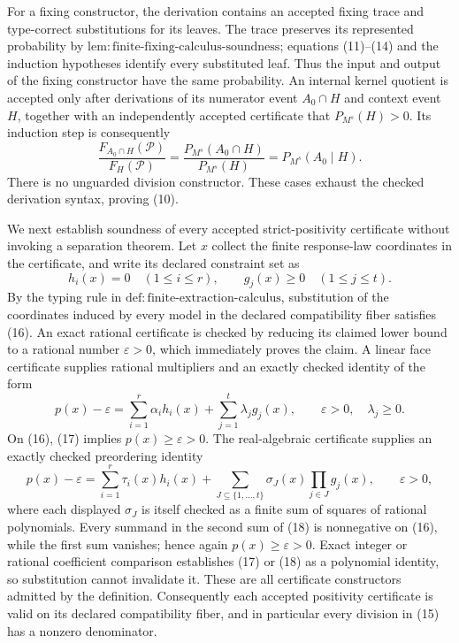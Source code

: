 For a fixing constructor, the derivation contains an accepted fixing trace and type-correct substitutions for its leaves.  The trace preserves its represented probability by \(\mathrm{lem:finite\text{-}fixing\text{-}calculus\text{-}soundness}\); equations (11)--(14) and the induction hypotheses identify every substituted leaf.  Thus the input and output of the fixing constructor have the same probability.  An internal kernel quotient is accepted only after derivations of its numerator event \(A_0\cap H\) and context event \(H\), together with an independently accepted certificate that \(P_{M^s}(H)>0\).  Its induction step is consequently
\[
 \frac{F_{A_0\cap H}(\mathcal P)}{F_H(\mathcal P)}
 =\frac{P_{M^s}(A_0\cap H)}{P_{M^s}(H)}
 =P_{M^s}(A_0\mid H).
\tag{15}
\]
There is no unguarded division constructor.  These cases exhaust the checked derivation syntax, proving (10).

We next establish soundness of every accepted strict-positivity certificate without invoking a separation theorem.  Let \(x\) collect the finite response-law coordinates in the certificate, and write its declared constraint set as
\[
 h_i(x)=0\quad(1\le i\le r),
 \qquad g_j(x)\ge0\quad(1\le j\le t).
\tag{16}
\]
By the typing rule in \(\mathrm{def:finite\text{-}extraction\text{-}calculus}\), substitution of the coordinates induced by every model in the declared compatibility fiber satisfies (16).  An exact rational certificate is checked by reducing its claimed lower bound to a rational number \(\varepsilon>0\), which immediately proves the claim.  A linear face certificate supplies rational multipliers and an exactly checked identity of the form
\[
 p(x)-\varepsilon
 =\sum_{i=1}^{r}\alpha_i h_i(x)
  +\sum_{j=1}^{t}\lambda_j g_j(x),
 \qquad \varepsilon>0,\quad \lambda_j\ge0.
\tag{17}
\]
On (16), (17) implies \(p(x)\ge\varepsilon>0\).  The real-algebraic certificate supplies an exactly checked preordering identity
\[
 p(x)-\varepsilon
 =\sum_{i=1}^{r}\tau_i(x)h_i(x)
  +\sum_{J\subseteq\{1,\ldots,t\}}
    \sigma_J(x)\prod_{j\in J}g_j(x),
 \qquad \varepsilon>0,
\tag{18}
\]
where each displayed \(\sigma_J\) is itself checked as a finite sum of squares of rational polynomials.  Every summand in the second sum of (18) is nonnegative on (16), while the first sum vanishes; hence again \(p(x)\ge\varepsilon>0\).  Exact integer or rational coefficient comparison establishes (17) or (18) as a polynomial identity, so substitution cannot invalidate it.  These are all certificate constructors admitted by the definition.  Consequently each accepted positivity certificate is valid on its declared compatibility fiber, and in particular every division in (15) has a nonzero denominator.


